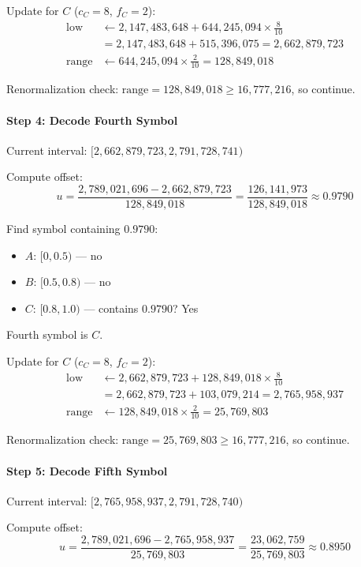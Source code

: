 Update for $C$ ($c_C=8$, $f_C=2$):
\[
\begin{aligned}
\text{low} &\gets 2{,}147{,}483{,}648 + 644{,}245{,}094 \times \frac{8}{10} \\
&= 2{,}147{,}483{,}648 + 515{,}396{,}075 = 2{,}662{,}879{,}723 \\
\text{range} &\gets 644{,}245{,}094 \times \frac{2}{10} = 128{,}849{,}018
\end{aligned}
\]

Renormalization check: $\text{range} = 128{,}849{,}018 \ge 16{,}777{,}216$, so continue.

\paragraph{Step 4: Decode Fourth Symbol}

Current interval: $[2{,}662{,}879{,}723, 2{,}791{,}728{,}741)$

Compute offset:
\[
u = \frac{2{,}789{,}021{,}696 - 2{,}662{,}879{,}723}{128{,}849{,}018} = \frac{126{,}141{,}973}{128{,}849{,}018} \approx 0.9790
\]

Find symbol containing $0.9790$:
\begin{itemize}
    \item $A$: $[0, 0.5)$ — no
    \item $B$: $[0.5, 0.8)$ — no
    \item $C$: $[0.8, 1.0)$ — contains $0.9790$? Yes
\end{itemize}
Fourth symbol is $C$.

Update for $C$ ($c_C=8$, $f_C=2$):
\[
\begin{aligned}
\text{low} &\gets 2{,}662{,}879{,}723 + 128{,}849{,}018 \times \frac{8}{10} \\
&= 2{,}662{,}879{,}723 + 103{,}079{,}214 = 2{,}765{,}958{,}937 \\
\text{range} &\gets 128{,}849{,}018 \times \frac{2}{10} = 25{,}769{,}803
\end{aligned}
\]

Renormalization check: $\text{range} = 25{,}769{,}803 \ge 16{,}777{,}216$, so continue.

\paragraph{Step 5: Decode Fifth Symbol}

Current interval: $[2{,}765{,}958{,}937, 2{,}791{,}728{,}740)$

Compute offset:
\[
u = \frac{2{,}789{,}021{,}696 - 2{,}765{,}958{,}937}{25{,}769{,}803} = \frac{23{,}062{,}759}{25{,}769{,}803} \approx 0.8950
\]

